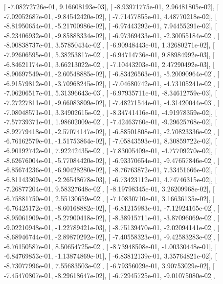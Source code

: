 \documentclass{article}
\begin{document}
       [ -7.08272726e-01,   9.16608193e-03],
       [ -8.93971775e-01,   2.96481805e-02],
       [ -7.02052687e-01,  -9.84542420e-02],
       [ -7.71477855e-01,   4.48770218e-02],
       [ -8.81950654e-01,  -5.21700986e-02],
       [ -6.97443292e-01,   7.94455291e-02],
       [ -8.23406932e-01,  -9.85888334e-02],
       [ -6.97369433e-01,  -2.30055184e-02],
       [ -8.00838737e-01,   3.57850434e-02],
       [ -6.90948443e-01,   1.32680271e-02],
       [ -7.92606595e-01,   5.38253817e-02],
       [ -6.94714736e-01,   9.88984992e-03],
       [ -6.84621174e-01,   3.66213022e-02],
       [ -7.10443203e-01,   2.47290492e-03],
       [ -8.90697549e-01,  -2.60548885e-02],
       [ -6.83426563e-01,  -5.20090964e-02],
       [ -6.91579812e-01,  -3.70968245e-02],
       [ -7.04680742e-01,  -4.73105241e-02],
       [ -7.06206517e-01,   5.31396643e-03],
       [ -6.97935711e-01,  -8.34612759e-03],
       [ -7.27227811e-01,  -9.66083809e-02],
       [ -7.48271544e-01,  -4.31420044e-03],
       [ -7.08048571e-01,   3.34902615e-02],
       [ -8.34741416e-01,  -4.91978359e-02],
       [ -7.57739371e-01,   1.98602009e-02],
       [ -7.42463760e-01,  -9.29625768e-02],
       [ -8.92779418e-01,  -2.57074147e-02],
       [ -6.88501808e-01,  -2.70823336e-02],
       [ -6.76162579e-01,  -1.51753864e-02],
       [ -7.05843593e-01,   8.30859722e-02],
       [ -6.90192742e-01,   7.92242435e-02],
       [ -7.83005409e-01,  -4.77709270e-02],
       [ -8.62676004e-01,  -5.77084420e-02],
       [ -6.93370654e-01,  -9.47657846e-02],
       [ -6.85674236e-01,  -6.90428280e-02],
       [ -8.76763872e-01,   7.33451666e-02],
       [ -6.81143309e-01,  -2.26548678e-03],
       [ -6.73423112e-01,   4.74746315e-02],
       [ -7.26877204e-01,   9.58327648e-02],
       [ -8.19798345e-01,   3.26209968e-02],
       [ -6.75881750e-01,   2.55130659e-02],
       [ -7.10830710e-01,   3.16636135e-02],
       [ -6.76425172e-01,  -8.60168882e-02],
       [ -6.81215983e-01,  -7.12924165e-02],
       [ -8.95061909e-01,  -5.27900418e-02],
       [ -8.38915711e-01,  -3.87096069e-02],
       [ -9.02210948e-01,  -1.22789421e-03],
       [ -8.75139470e-01,  -2.02094141e-02],
       [ -8.68946744e-01,  -2.89870292e-02],
       [ -7.40558323e-01,  -9.42583283e-02],
       [ -6.76150587e-01,   8.50654725e-02],
       [ -8.73948508e-01,  -1.00330448e-01],
       [ -6.84769853e-01,  -1.13874869e-01],
       [ -6.83812139e-01,   3.35764821e-02],
       [ -8.73077996e-01,   7.55683503e-02],
       [ -6.79356029e-01,   3.90753029e-02],
       [ -7.45470807e-01,  -8.29618647e-02],
       [ -6.72945725e-01,  -9.01075080e-02],
\end{document}
